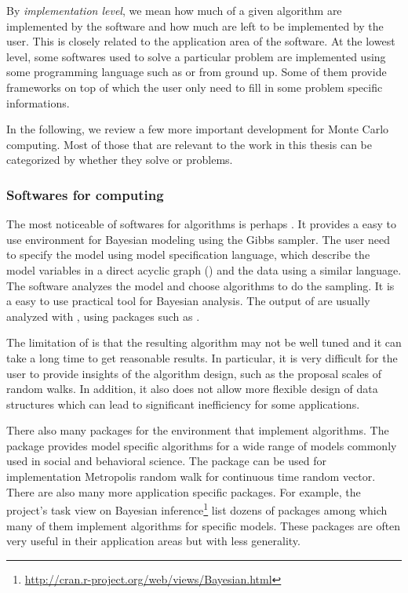 By \emph{implementation level}, we mean how much of a given algorithm are
implemented by the software and how much are left to be implemented by the
user. This is closely related to the application area of the software. At the
lowest level, some softwares used to solve a particular problem are
implemented using some programming language such as \rlang or \cpp from ground
up. Some of them provide frameworks on top of which the user only need to fill
in some problem specific informations.

In the following, we review a few more important development for Monte Carlo
computing. Most of those that are relevant to the work in this thesis can be
categorized by whether they solve \mcmc or \smc problems.

\subsubsection{Softwares for \protect\mcmc computing}
\label{ssub:Softwares for mcmc computing}

The most noticeable of softwares for \mcmc algorithms is perhaps \bugs
\cite{bugs, bugsbook}. It provides a easy to use environment for Bayesian
modeling using the Gibbs sampler. The user need to specify the model using
\bugs model specification language, which describe the model variables in a
direct acyclic graph (\dag) and the data using a similar language. The
software analyzes the model and choose \mcmc algorithms to do the sampling. It
is a easy to use practical tool for Bayesian analysis. The output of \bugs are
usually analyzed with \rlang, using packages such as \rcoda \cite{rcoda}.

The limitation of \bugs is that the resulting algorithm may not be well tuned
and it can take a long time to get reasonable results. In particular, it is
very difficult for the user to provide insights of the algorithm design, such
as the proposal scales of random walks. In addition, it also does not allow
more flexible design of data structures which can lead to significant
inefficiency for some applications.

There also many packages for the \rlang environment that implement \mcmc
algorithms. The \rmcmcpack \cite{rmcmcpack} package provides model specific
\mcmc algorithms for a wide range of models commonly used in social and
behavioral science. The \rmcmc \cite{rmcmc} package can be used for
implementation Metropolis random walk for continuous time random vector. There
are also many more application specific packages. For example, the \rlang
project's task view on Bayesian
inference\footnote{\url{http://cran.r-project.org/web/views/Bayesian.html}}
list dozens of packages among which many of them implement \mcmc algorithms
for specific models. These packages are often very useful in their application
areas but with less generality.

